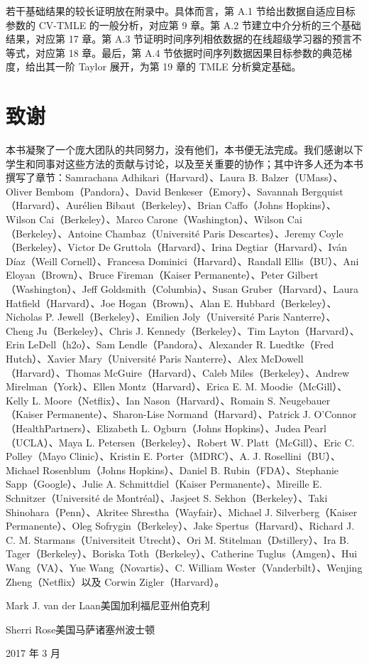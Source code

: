 若干基础结果的较长证明放在附录中。具体而言，第 A.1 节给出数据自适应目标参数的 CV-TMLE 的一般分析，对应第 9 章。第 A.2 节建立中介分析的三个基础结果，对应第 17 章。第 A.3 节证明时间序列相依数据的在线超级学习器的预言不等式，对应第 18 章。最后，第 A.4 节依据时间序列数据因果目标参数的典范梯度，给出其一阶 Taylor 展开，为第 19 章的 TMLE 分析奠定基础。

\section*{致谢}

本书凝聚了一个庞大团队的共同努力，没有他们，本书便无法完成。我们感谢以下学生和同事对这些方法的贡献与讨论，以及至关重要的协作；其中许多人还为本书撰写了章节：Samrachana Adhikari（Harvard）、Laura B. Balzer（UMass）、Oliver Bembom（Pandora）、David Benkeser（Emory）、Savannah Bergquist（Harvard）、Aurélien Bibaut（Berkeley）、Brian Caffo（Johns Hopkins）、Wilson Cai（Berkeley）、Marco Carone（Washington）、Wilson Cai（Berkeley）、Antoine Chambaz（Université Paris Descartes）、Jeremy Coyle（Berkeley）、Victor De Gruttola（Harvard）、Irina Degtiar（Harvard）、Iván Díaz（Weill Cornell）、Francesa Dominici（Harvard）、Randall Ellis（BU）、Ani Eloyan（Brown）、Bruce Fireman（Kaiser Permanente）、Peter Gilbert（Washington）、Jeff Goldsmith（Columbia）、Susan Gruber（Harvard）、Laura Hatfield（Harvard）、Joe Hogan（Brown）、Alan E. Hubbard（Berkeley）、Nicholas P. Jewell（Berkeley）、Emilien Joly（Université Paris Nanterre）、Cheng Ju（Berkeley）、Chris J. Kennedy（Berkeley）、Tim Layton（Harvard）、Erin LeDell（h2o）、Sam Lendle（Pandora）、Alexander R. Luedtke（Fred Hutch）、Xavier Mary（Université Paris Nanterre）、Alex McDowell（Harvard）、Thomas McGuire（Harvard）、Caleb Miles（Berkeley）、Andrew Mirelman（York）、Ellen Montz（Harvard）、Erica E. M. Moodie（McGill）、Kelly L. Moore（Netflix）、Ian Nason（Harvard）、Romain S. Neugebauer（Kaiser Permanente）、Sharon-Lise Normand（Harvard）、Patrick J. O'Connor（HealthPartners）、Elizabeth L. Ogburn（Johns Hopkins）、Judea Pearl（UCLA）、Maya L. Petersen（Berkeley）、Robert W. Platt（McGill）、Eric C. Polley（Mayo Clinic）、Kristin E. Porter（MDRC）、A. J. Rosellini（BU）、Michael Rosenblum（Johns Hopkins）、Daniel B. Rubin（FDA）、Stephanie Sapp（Google）、Julie A. Schmittdiel（Kaiser Permanente）、Mireille E. Schnitzer（Université de Montréal）、Jasjeet S. Sekhon（Berkeley）、Taki Shinohara（Penn）、Akritee Shrestha（Wayfair）、Michael J. Silverberg（Kaiser Permanente）、Oleg Sofrygin（Berkeley）、Jake Spertus（Harvard）、Richard J. C. M. Starmans（Universiteit Utrecht）、Ori M. Stitelman（Dstillery）、Ira B. Tager（Berkeley）、Boriska Toth（Berkeley）、Catherine Tuglus（Amgen）、Hui Wang（VA）、Yue Wang（Novartis）、C. William Wester（Vanderbilt）、Wenjing Zheng（Netflix）以及 Corwin Zigler（Harvard）。

\begin{flushright}
Mark J. van der Laan\quad 美国加利福尼亚州伯克利\par
Sherri Rose\quad 美国马萨诸塞州波士顿\par
2017 年 3 月
\end{flushright}
